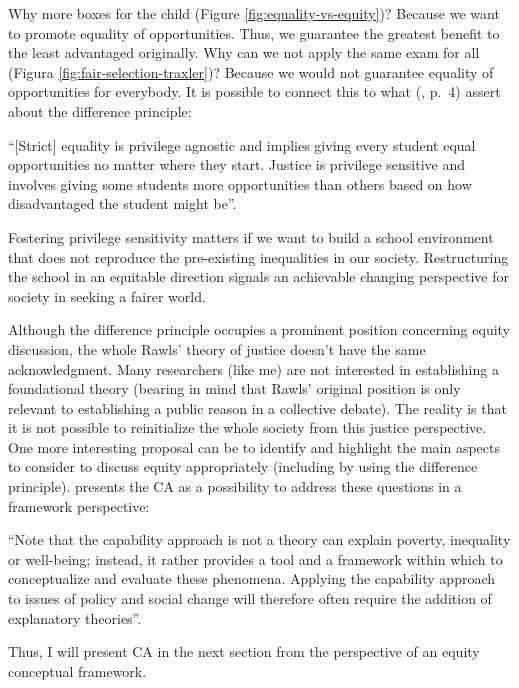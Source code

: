 Why more boxes for the child (Figure \ref{fig:equality-vs-equity})? Because we want to promote equality of opportunities. Thus, we guarantee the greatest benefit to the least advantaged originally. Why can we not apply the same exam for all (Figura \ref{fig:fair-selection-traxler})? Because we would not guarantee equality of opportunities for everybody. It is possible to connect this to what  (\citeyear{parker:2015}, p.~4) assert about the difference principle:
\begin{citacao}
    “[Strict] equality is privilege agnostic and implies giving every student equal opportunities no matter where they start. Justice is privilege sensitive and involves giving some students more opportunities than others based on how disadvantaged the student might be”.
\end{citacao}
Fostering privilege sensitivity matters if we want to build a school environment that does not reproduce the pre-existing inequalities in our society. Restructuring the school in an equitable direction signals an achievable changing perspective for society in seeking a fairer world.

Although the difference principle occupies a prominent position concerning equity discussion, the whole Rawls' theory of justice doesn't have the same acknowledgment. Many researchers (like me) are not interested in establishing a foundational theory (bearing in mind that Rawls' original position is only relevant to establishing a public reason in a collective debate). The reality is that it is not possible to reinitialize the whole society from this justice perspective. One more interesting proposal can be to identify and highlight the main aspects to consider to discuss equity appropriately (including by using the difference principle).  presents the \acrfull{CA} as a possibility to address these questions in a framework perspective:
\begin{citacao}
    “Note that the capability approach is not a theory can explain poverty, inequality or well-being; instead, it rather provides a tool and a framework within which to conceptualize and evaluate these phenomena. Applying the capability approach to issues of policy and social change will therefore often require the addition of explanatory theories”.
\end{citacao}
Thus, I will present \gls{CA} in the next section from the perspective of an equity 
 conceptual framework.
        
